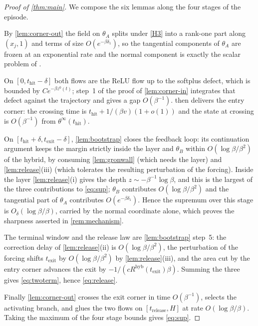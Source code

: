 \documentclass[11pt]{article}
\theoremstyle{definition}
\theoremstyle{remark}
\newcommand{\thit}{t_{\mathrm{hit}}}
\newcommand{\texit}{t_{\mathrm{exit}}}
\newcommand{\trel}{t_{\mathrm{release}}}
\newcommand{\hyb}{\mathrm{hyb}}
\begin{document}
\begin{proof}[Proof of \cref{thm:main}]
We compose the six lemmas along the four stages of the episode.

By \cref{lem:corner-out} the field on $\theta_A$ splits under \eqref{H3} into a
rank-one part along $(x_j,1)$ and terms of size $O(e^{-\beta\delta_1})$, so the
tangential components of $\theta_A$ are frozen at an exponential rate and the
normal component is exactly the scalar problem of
.

On $[0,\thit-\delta]$ both flows are the ReLU flow up to the softplus defect,
which is bounded by $C e^{-\beta z^0(t)}$; step~1 of the proof of
\cref{lem:corner-in} integrates that defect against the trajectory and gives a
gap $O(\beta^{-1})$.  then delivers the entry corner: the
crossing time is $\thit+1/(\beta v)(1+o(1))$ and the state at crossing is
$O(\beta^{-1})$ from $\theta^\infty(\thit)$.

On $[\thit+\delta,\texit-\delta]$, \cref{lem:bootstrap} closes the feedback loop:
its continuation argument keeps the margin strictly inside the layer and
$\theta_B$ within $O(\log\beta/\beta^{2})$ of the hybrid, by consuming
\cref{lem:gronwall} (which needs the layer) and \cref{lem:release}(iii) (which
tolerates the resulting perturbation of the forcing). Inside the layer
\cref{lem:release}(i) gives the depth $z\sim-\beta^{-1}\log\beta$, and this is the
largest of the three contributions to \eqref{eq:sup}; $\theta_B$ contributes
$O(\log\beta/\beta^{2})$ and the tangential part of $\theta_A$ contributes
$O(e^{-\beta\delta_1})$. Hence the supremum over this stage is
$O_\delta(\log\beta/\beta)$, carried by the normal coordinate alone, which proves
the sharpness asserted in \cref{rem:mechanism}.

The terminal window and the release law are \cref{lem:bootstrap} step~5: the
correction delay of \cref{lem:release}(ii) is $O(\log\beta/\beta^{2})$, the
perturbation of the forcing shifts $\texit$ by $O(\log\beta/\beta^{2})$ by
\cref{lem:release}(iii), and the area cut by the entry corner advances the exit by
$-1/(cR^{\hyb}(\texit)\beta)$. Summing the three gives \eqref{eq:twoterm}, hence
\eqref{eq:release}.

Finally \cref{lem:corner-out} crosses the exit corner in time $O(\beta^{-1})$,
selects the activating branch, and glues the two flows on $[\trel,H]$ at rate
$O(\log\beta/\beta)$. Taking the maximum of the four stage bounds gives
\eqref{eq:sup}.
\end{proof}
\end{document}
